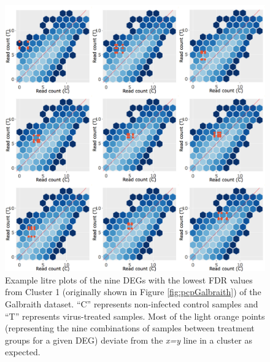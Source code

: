 \documentclass[11pt,a4paper,oldfontcommands,openany]{memoir}
\numberwithin{equation}{section} %
\begin{document}
\begin{figure}[H]
\begin{framed}
  \includegraphics[width=\textwidth]{Images/litreCluster1}
\end{framed}
  \caption{Example litre plots of the nine DEGs with the lowest FDR values from Cluster 1 (originally shown in Figure \ref{fig:pcpGalbraith}) of the Galbraith dataset. ``C'' represents non-infected control samples and ``T'' represents virus-treated samples. Most of the light orange points (representing the nine combinations of samples between treatment groups for a given DEG) deviate from the \textit{x=y} line in a cluster as expected.}
  \label{fig:litreCluster1}
\end{figure}
\end{document}
